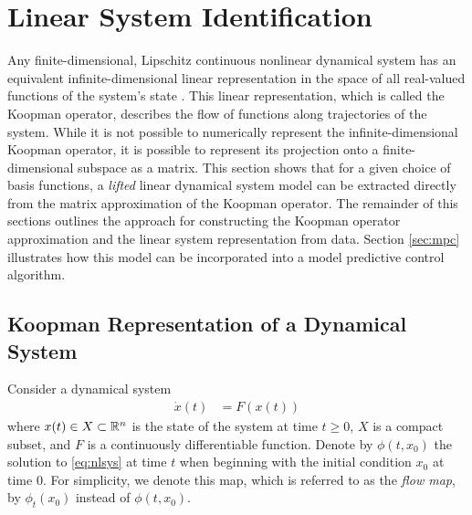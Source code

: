 \section{Linear System Identification}
\label{sec:sysid}

Any finite-dimensional, Lipschitz continuous nonlinear dynamical system has an equivalent infinite-dimensional linear representation in the space of all real-valued functions of the system's state \cite[Definition 3.3.1]{lasota2013chaos}.
This linear representation, which is called the Koopman operator, describes the flow of functions along trajectories of the system.
While it is not possible to numerically represent the infinite-dimensional Koopman operator, it is possible to represent its projection onto a finite-dimensional subspace as a matrix.
This section shows that for a given choice of basis functions, a \emph{lifted} linear dynamical system model can be extracted directly from the matrix approximation of the Koopman operator.
The remainder of this sections outlines the approach for constructing the Koopman operator approximation and the linear system representation from data.
Section \ref{sec:mpc} illustrates how this model can be incorporated into a model predictive control algorithm.

\subsection{Koopman Representation of a Dynamical System}

Consider a dynamical system
\begin{align}
    \dot{x}(t) &= F (x(t))
    \label{eq:nlsys}
\end{align}
where $x(t) \in X \subset \mathbb{R}^n$ is the state of the system at time $t \geq 0$, $X$ is a compact subset, and ${F}$ is a continuously differentiable function.
Denote by $\phi(t,x_0)$ the solution to \eqref{eq:nlsys} at time $t$ when beginning with the initial condition $x_0$ at time $0$.
For simplicity, we denote this map, which is referred to as the \emph{flow map}, by $\phi_t (x_0)$ instead of $\phi (t, x_0)$.

